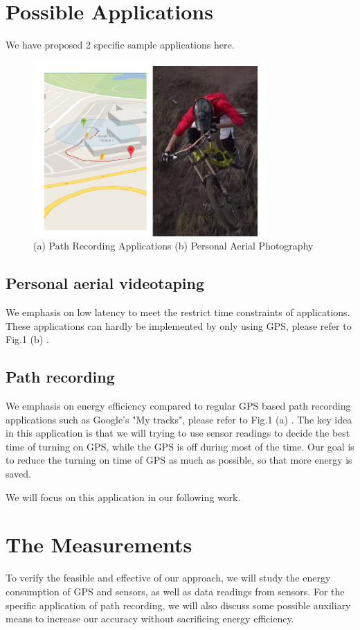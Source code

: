 \documentclass[journal]{IEEEtran}
\begin{document}
\section{Possible Applications}
We have proposed 2 specific sample applications here.

\begin{figure}
	\centering
	\includegraphics[width=3.5in]{figures/pic}
	\caption{(a) Path Recording Applications	(b) Personal Aerial Photography}
\end{figure}

\subsection{Personal aerial videotaping}
We emphasis on low latency to meet the restrict time constraints of applications. These applications can hardly be implemented by only using GPS, please refer to Fig.1 (b) .

\subsection{Path recording}
We emphasis on energy efficiency compared to regular GPS based path recording applications such as Google's "My tracks", please refer to Fig.1 (a) . 
The key idea in this application is that we will trying to use sensor readings to decide the best time of turning on GPS, while the GPS is off during most of the time.
Our goal is to reduce the turning on time of GPS as much as possible, so that more energy is saved. 

We will focus on this application in our following work. 

\section{The Measurements}
To verify the feasible and effective of our approach, we will study the energy consumption of GPS and sensors, as well as data readings from sensors.
For the specific application of path recording, we will also discuss some possible auxiliary means to increase our accuracy without sacrificing energy efficiency.
\end{document}
